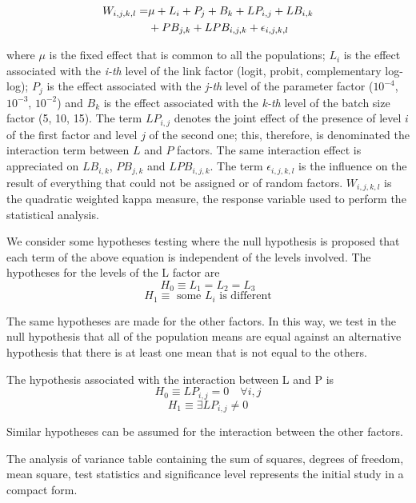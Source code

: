 \documentclass[10pt, a4paper, titlepage, twocolumn]{article}
\begin{document}
	\begin{equation}
	\begin{aligned}
	\footnotesize
	W_{i,j,k,l} = & \mu + L_i + P_j + B_k + LP_{i,j} + LB_{i,k} \\& + PB_{j,k} + LPB_{i,j,k} + \epsilon_{i,j,k,l}
	\label{eq:anova3}
	\end{aligned}
	\end{equation}
	
	where $\mu$ is the fixed effect that is common to all the populations; $L_i$ is the effect associated with the \textit{i-th} level of the link factor (logit, probit, complementary log-log); $P_j$ is the effect associated with the \textit{j-th} level of the parameter factor ($10^{-4}$, $10^{-3}$, $10^{-2}$) and $B_k$ is the effect associated with the \textit{k-th} level of the batch size factor (5, 10, 15). The term $LP_{i,j}$ denotes the joint effect of the presence of level $i$ of the first factor and level $j$ of the second one; this, therefore, is denominated the interaction term between $L$ and $P$ factors. The same interaction effect is appreciated on $LB_{i,k}$, $PB_{j,k}$ and $LPB_{i,j,k}$. The term $\epsilon_{i,j,k,l}$ is the influence on the result of everything that could not be assigned or of random factors. $W_{i,j,k,l}$ is the quadratic weighted kappa measure, the response variable used to perform the statistical analysis.
	
	We consider some hypotheses testing where the null hypothesis is proposed that each term of the above equation is independent of the levels involved. The hypotheses for the levels of the L factor are
	\[
		H_0 \equiv L_1 = L_2 = L_3
	\]
	\[
		H_1 \equiv \text{ some } L_i \text{ is different}
	\]
	
	The same hypotheses are made for the other factors. In this way, we test in the null hypothesis that all of the population means are equal against an alternative hypothesis that there is at least one mean that is not equal to the others.
	
	The hypothesis associated with the interaction between L and P is
	\[
		H_0 \equiv LP_{i,j} = 0 \quad \forall i,j
	\]
	\[
		H_1 \equiv \exists LP_{i,j} \ne 0
	\]
	
	Similar hypotheses can be assumed for the interaction between the other factors.
	
	The analysis of variance table containing the sum of squares, degrees of freedom, mean square, test statistics and significance level represents the initial study in a compact form.
	
\end{document}
